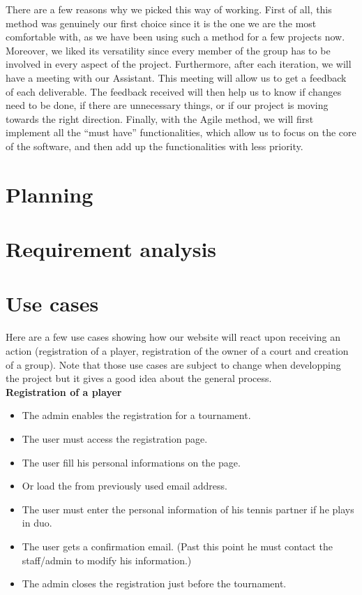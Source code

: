 \documentclass[a4paper, 12pt]{article}
\begin{document}
There are a few reasons why we picked this way of working. First of all, this method was genuinely our first choice since it is the one we are the most comfortable with, as we have been using such a method for a few projects now. Moreover, we liked its versatility since every member of the group has to be involved in every aspect of the project. Furthermore, after each iteration, we will have a meeting with our Assistant. This meeting will allow us to get a feedback of each deliverable. The feedback received will then help us to know if changes need to be done, if there are unnecessary things, or if our project is moving towards the right direction. Finally, with the Agile method, we will first implement all the “must have” functionalities, which allow us to focus on the core of the software, and then add up the functionalities with less priority. \\

\section{Planning}



\section{Requirement analysis}


\section{Use cases}

Here are a few use cases showing how our website will react upon receiving an action (registration of a player, registration of the owner of a court and creation of a group). Note that those use cases are subject to change when developping the project but it gives a good idea about the general process.\\

\textbf{Registration of a player}

\begin{itemize}
	\item The admin enables the registration for a tournament.
	\item The user must access the registration page.
	\item The user fill his personal informations on the page.
	\item Or load the from previously used email address. 
	\item The user must enter the personal information of his tennis partner if he plays in duo.
	\item The user gets a confirmation email. (Past this point he must contact the staff/admin to modify his information.)
	\item The admin closes the registration just before the tournament.
\end{itemize}
\end{document}
